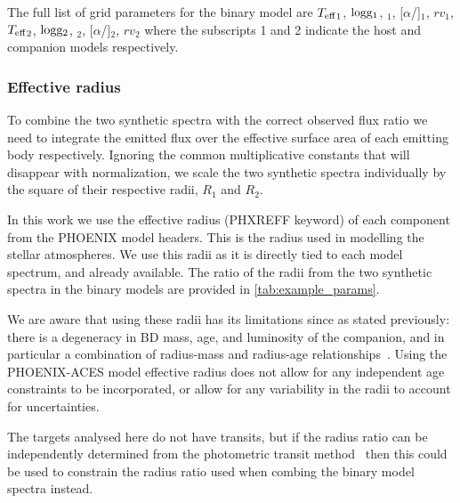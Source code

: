 {\red{} The full list of grid parameters for the binary model are \({T_{\mathrm{eff}}}_{1}\),  \(\textrm{logg}{}_1\), \feh{}\(_1\), [\(\alpha\)/]\(_1\), \({rv}_1\), \({T_{\mathrm{eff}}}_{2}\), \(\textrm{logg}{}_2\), \feh{}\(_2\), [\(\alpha\)/]\(_2\), \({rv}_2\) where the subscripts 1 and 2 indicate the host and companion models respectively.}






\subsubsection{Effective radius}
\label{subsection-radius}

To combine the two synthetic spectra with the correct observed flux ratio we need to integrate the emitted flux over the effective surface area of each emitting body respectively.
Ignoring the common multiplicative constants that will disappear with normalization, we scale the two synthetic spectra individually by the square of their respective radii, \(R_1\) and \(R_2\).

In this work we use the effective radius (PHXREFF keyword) of each component from the {PHOENIX} model headers.
This is the radius used in modelling the stellar atmospheres.
We use this radii as it is directly tied to each model spectrum, and already available.
The ratio of the radii from the two synthetic spectra in the binary models are provided in \cref{tab:example_params}.

We are aware that using these radii has its limitations since as stated previously: there is a degeneracy in {BD} mass, age, and luminosity of the companion, and in particular a combination of radius-mass and radius-age relationships~\citep{sorahana_radii_2013}.
Using the {PHOENIX-ACES} model effective radius does not allow for any independent age constraints to be incorporated, or allow for any variability in the radii to account for uncertainties.

The targets analysed here do not have transits, but if the radius ratio can be independently determined from the photometric transit method~\citep{deeg_photometric_1998} then this could be used to constrain the radius ratio used when combing the binary model spectra instead.


